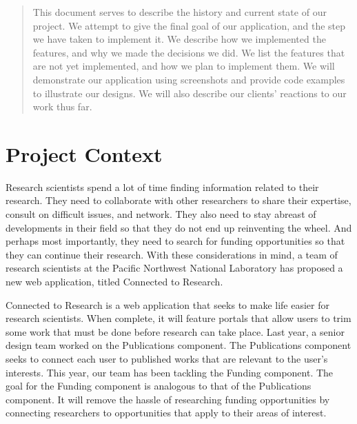 \documentclass[onecolumn]{IEEEtran}
\begin{document}
\begin{titlepage}
    \begin{minipage}{1.0\textwidth}
        \begin{abstract}
            This document serves to describe the history and current state of our project. We attempt to give the final goal of our application, and the step we have taken to implement it. We describe how we implemented the features, and why we made the decisions we did. We list the features that are not yet implemented, and how we plan to implement them. We will demonstrate our application using screenshots and provide code examples to illustrate our designs. We will also describe our clients' reactions to our work thus far.        
        \end{abstract}
    \end{minipage}

\end{titlepage}

\tableofcontents
\pagebreak	%

\section{Project Context}
Research scientists spend a lot of time finding information related to their research. They need to collaborate with other researchers to share their expertise, consult on difficult issues, and network. They also need to stay abreast of developments in their field so that they do not end up reinventing the wheel. And perhaps most importantly, they need to search for funding opportunities so that they can continue their research. With these considerations in mind, a team of research scientists at the Pacific Northwest National Laboratory has proposed a new web application, titled Connected to Research. 

Connected to Research is a web application that seeks to make life easier for research scientists. When complete, it will feature portals that allow users to trim some work that must be done before research can take place. Last year, a senior design team worked on the Publications component. The Publications component seeks to connect each user to published works that are relevant to the user's interests. This year, our team has been tackling the Funding component. The goal for the Funding component is analogous to that of the Publications component. It will remove the hassle of researching funding opportunities by connecting researchers to opportunities that apply to their areas of interest.
\end{document}
